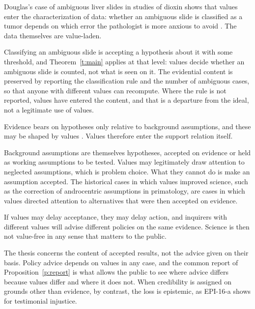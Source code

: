 \documentclass{situationist-preprint}
\begin{document}
\begin{objection}
Douglas's case of ambiguous liver slides in studies of dioxin shows that values enter the characterization of data: whether an ambiguous slide is classified as a tumor depends on which error the pathologist is more anxious to avoid \citep{Douglas2000}. The data themselves are value-laden.
\end{objection}

\begin{reply}
Classifying an ambiguous slide is accepting a hypothesis about it with some threshold, and Theorem~\ref{t:main} applies at that level: values decide whether an ambiguous slide is counted, not what is seen on it. The evidential content is preserved by reporting the classification rule and the number of ambiguous cases, so that anyone with different values can recompute. Where the rule is not reported, values have entered the content, and that is a departure from the ideal, not a legitimate use of values.
\end{reply}

\begin{objection}
Evidence bears on hypotheses only relative to background assumptions, and these may be shaped by values \citep{Longino1990}. Values therefore enter the support relation itself.
\end{objection}

\begin{reply}
Background assumptions are themselves hypotheses, accepted on evidence or held as working assumptions to be tested. Values may legitimately draw attention to neglected assumptions, which is problem choice. What they cannot do is make an assumption accepted. The historical cases in which values improved science, such as the correction of androcentric assumptions in primatology, are cases in which values directed attention to alternatives that were then accepted on evidence.
\end{reply}

\begin{objection}
If values may delay acceptance, they may delay action, and inquirers with different values will advise different policies on the same evidence. Science is then not value-free in any sense that matters to the public.
\end{objection}

\begin{reply}
The thesis concerns the content of accepted results, not the advice given on their basis. Policy advice depends on values in any case, and the common report of Proposition~\ref{p:report} is what allows the public to see where advice differs because values differ and where it does not. When credibility is assigned on grounds other than evidence, by contrast, the loss is epistemic, as EPI-16-a shows for testimonial injustice.
\end{reply}
\end{document}
